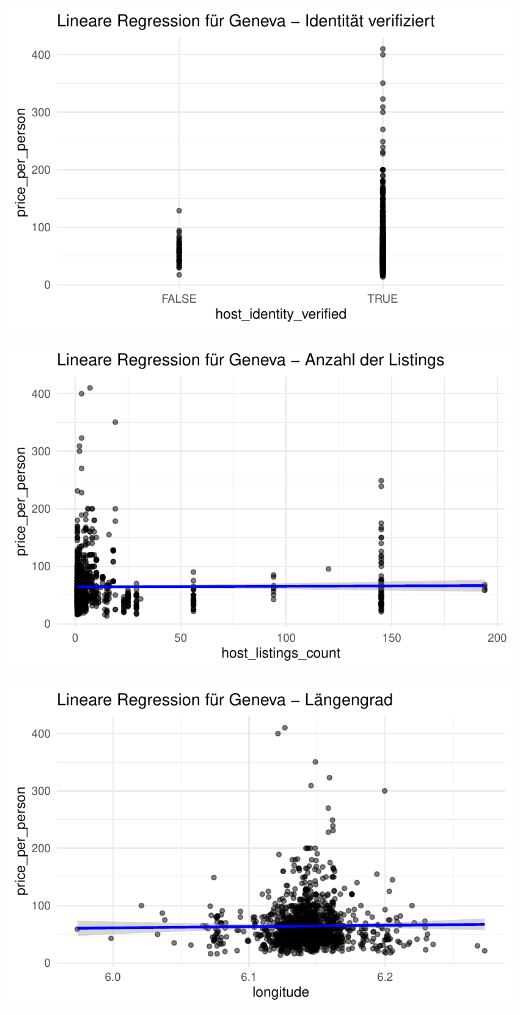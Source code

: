 \documentclass[
  journal,
]{IEEEtran}%
\begin{document}
\includegraphics{main_files/figure-pdf/unnamed-chunk-16-5.pdf}

\includegraphics{main_files/figure-pdf/unnamed-chunk-16-6.pdf}

\includegraphics{main_files/figure-pdf/unnamed-chunk-16-7.pdf}
\end{document}
